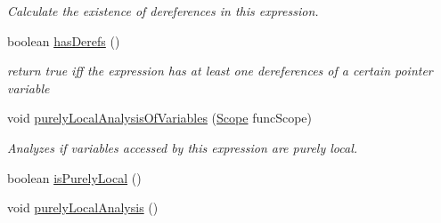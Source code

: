 \begin{DoxyCompactItemize}
\begin{DoxyCompactList}\small\item\em Calculate the existence of dereferences in this expression. \end{DoxyCompactList}\item 
boolean \hyperlink{interfaceedu_1_1udel_1_1cis_1_1vsl_1_1civl_1_1model_1_1IF_1_1expression_1_1Expression_af314a174f4360d682483fd9cdd520adc}{has\+Derefs} ()
\begin{DoxyCompactList}\small\item\em return true iff the expression has at least one dereferences of a certain pointer variable \end{DoxyCompactList}\item 
void \hyperlink{interfaceedu_1_1udel_1_1cis_1_1vsl_1_1civl_1_1model_1_1IF_1_1expression_1_1Expression_a6b6fe54d4e37b83906f8a199c2f9aff4}{purely\+Local\+Analysis\+Of\+Variables} (\hyperlink{interfaceedu_1_1udel_1_1cis_1_1vsl_1_1civl_1_1model_1_1IF_1_1Scope}{Scope} func\+Scope)
\begin{DoxyCompactList}\small\item\em Analyzes if variables accessed by this expression are purely local. \end{DoxyCompactList}\item 
boolean \hyperlink{interfaceedu_1_1udel_1_1cis_1_1vsl_1_1civl_1_1model_1_1IF_1_1expression_1_1Expression_aa3381f488f3e0b32a13d7233d8d2c2ae}{is\+Purely\+Local} ()
\item 
\hypertarget{interfaceedu_1_1udel_1_1cis_1_1vsl_1_1civl_1_1model_1_1IF_1_1expression_1_1Expression_a9d31dc345acc7916a5a37f5fd6a49df6}{}void \hyperlink{interfaceedu_1_1udel_1_1cis_1_1vsl_1_1civl_1_1model_1_1IF_1_1expression_1_1Expression_a9d31dc345acc7916a5a37f5fd6a49df6}{purely\+Local\+Analysis} ()\label{interfaceedu_1_1udel_1_1cis_1_1vsl_1_1civl_1_1model_1_1IF_1_1expression_1_1Expression_a9d31dc345acc7916a5a37f5fd6a49df6}


\end{DoxyCompactItemize}
